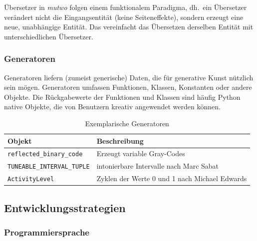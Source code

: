 \documentclass[12pt,a4paper,ngerman]{article}
\begin{document}
\smallskip


Übersetzer in \emph{mutwo} folgen einem funktionalem Paradigma, dh.\ ein Übersetzer verändert nicht die Eingangsentität (keine Seiteneffekte), sondern erzeugt eine neue, unabhängige Entität.
Das vereinfacht das Übersetzen derselben Entität mit unterschiedlichen Übersetzer.

\subsubsection{Generatoren}

Generatoren liefern (zumeist generische) Daten, die für generative Kunst nützlich sein mögen.
Generatoren umfassen Funktionen, Klassen, Konstanten oder andere Objekte.
Die Rückgabewerte der Funktionen und Klassen sind häufig Python native Objekte, die von Benutzern kreativ angewendet werden können.

\begin{table}[h!]
    \begin{center}
        \begin{tabular}{l l} 
            \hline
            Objekt & Beschreibung \\ [0.5ex] 
            \hline\hline
            \texttt{reflected\_binary\_code} & Erzeugt variable Gray-Codes \\
            \texttt{TUNEABLE\_INTERVAL\_TUPLE} & intonierbare Intervalle nach Marc Sabat \\
            \texttt{ActivityLevel} & Zyklen der Werte 0 und 1 nach Michael Edwards \\ [1ex] 
            \hline
        \end{tabular}
    \end{center}

    \caption{Exemplarische Generatoren}
\end{table}


\subsection{Entwicklungsstrategien}

\subsubsection{Programmiersprache}
\label{programmingLanguage}
\end{document}
